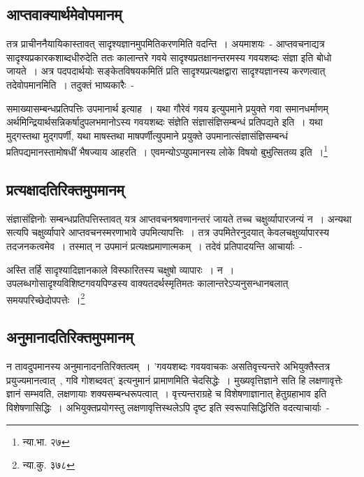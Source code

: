 		\subsection{आप्तवाक्यार्थमेवोपमानम्}

		तत्र प्राचीननैयायिकास्तावत् सादृश्यज्ञानमुपमितिकरणमिति वदन्ति~। अयमाशयः~- आप्तवचनाद्यत्र सादृश्यप्रकारकशाब्दधीरुदेति ततः कालान्तरे गवये सादृश्यप्रतक्षानन्तरमस्य गवयशब्दः संज्ञा इति बोधो जायते~। अत्र पदपदार्थयोः सङ्केतविषयकमितिं प्रति सादृश्यप्रत्यक्षद्वारा सादृश्यज्ञानस्य करणत्वात् तदेवोपमानमिति~। तदुक्तं  भाष्यकारैः~-

		{\fontsize{11.7}{0}\selectfont\s समाख्यासम्बन्धप्रतिपत्तिः उपमानार्थ इत्याह~। यथा गौरेवं गवय इत्युपमाने प्रयुक्ते गवा समानधर्माणम् अर्थमिन्द्रियार्थसन्निकर्षादुपलभमानोऽस्य गवयशब्दः संज्ञेति संज्ञासंज्ञिसम्बन्धं प्रतिपद्यते इति~। यथा मुद्गस्तथा मुद्गपर्णी, यथा माषस्तथा माषपर्णीत्युपमाने प्रयुक्ते उपमानात्संज्ञासंज्ञिसम्बन्धं प्रतिपद्यमानस्तामोषधीं भैषज्याय आहरति~। एवमन्योऽप्युपमानस्य लोके विषयो बुभुत्सितव्य इति~।\footnote{न्या.भा. २७}}

		\subsection{प्रत्यक्षादतिरिक्तमुपमानम्}

		संज्ञासंज्ञिनोः सम्बन्धप्रतिपत्तिस्तावत् यत्र आप्तवचनश्रवणानन्तरं जायते तच्च चक्षुर्व्यापारजन्यं न~। अन्यथा सत्यपि चक्षुर्व्यापारे आप्तवचनस्मरणाभावे उपमित्यापत्तिः~। तत्र उपमितेरनुदयात् केवलचक्षुर्व्यापारस्य तदजनकत्वमेव~। तस्मात् न उपमानं प्रत्यक्षप्रमाणात्मकम्~। तदेवं प्रतिपादयन्ति आचार्याः~-

		{\fontsize{11.7}{0}\selectfont\s अस्ति तर्हि सादृश्यादिज्ञानकाले विस्फारितस्य चक्षुषो व्यापारः~। न~। उपलब्धगोसादृश्यविशिष्टगवयपिण्डस्य वाक्यतदर्थस्मृतिमतः कालान्तरेऽप्यनुसन्धानबलात् समयपरिच्छेदोपपत्तेः~।\footnote{न्या.कु. ३७८}}

		\subsection{अनुमानादतिरिक्तमुपमानम्}

		न तावदुपमानस्य अनुमानादनतिरिक्तत्वम्~। 'गवयशब्दः गवयवाचकः असतिवृत्त्यन्तरे अभियुक्तैस्तत्र प्रयुज्यमानत्वात्~, गवि गोशब्दवत्' इत्यनुमानं प्रामाणमिति चेदसिद्धेः~। मुख्यवृत्तिज्ञाने सति हि लक्षणावृत्तेः ज्ञानं सम्भवति, लक्षणायाः शक्यसम्बन्धरूपत्वात्~। वृत्त्यन्तराग्रहे च विशेषणाज्ञानात् हेतुग्रहाभाव इति विशेषणासिद्धिः~। अभियुक्तप्रयोगस्तु लक्षणावृत्तिस्थलेऽपि दृष्ट इति स्वरूपासिद्धिरिति वदत्याचार्याः~- 


